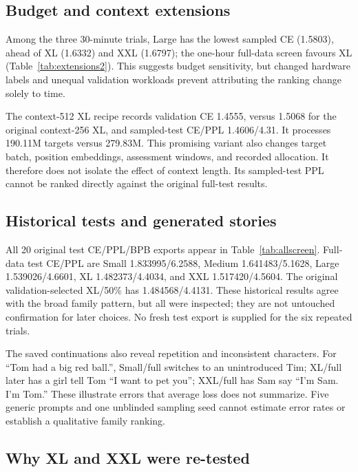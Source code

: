 \documentclass[10pt,twocolumn,letterpaper]{article}
\begin{document}
\subsection{Budget and context extensions}

Among the three 30-minute trials, Large has the lowest sampled CE (1.5803),
ahead of XL (1.6332) and XXL (1.6797); the one-hour full-data screen favours XL
(Table~\ref{tab:extensions2}). This suggests budget sensitivity, but changed
hardware labels and unequal validation workloads prevent attributing the
ranking change solely to time.



The context-512 XL recipe records validation CE 1.4555, versus 1.5068 for the
original context-256 XL, and sampled-test CE/PPL 1.4606/4.31. It processes
190.11M targets versus 279.83M. This promising variant also changes target
batch, position embeddings, assessment windows, and recorded allocation.
It therefore does not isolate the effect of context length. Its sampled-test
PPL cannot be ranked directly against the original full-test results.

\subsection{Historical tests and generated stories}

All 20 original test CE/PPL/BPB exports appear in Table~\ref{tab:allscreen}.
Full-data test CE/PPL are Small 1.833995/6.2588, Medium 1.641483/5.1628,
Large 1.539026/4.6601, XL 1.482373/4.4034, and XXL 1.517420/4.5604.
The original validation-selected XL/50\% has 1.484568/4.4131. These historical
results agree with the broad family pattern, but all were inspected; they are
not untouched confirmation for later choices. No fresh test export is supplied
for the six repeated trials.

The saved continuations also reveal repetition and inconsistent characters.
For ``Tom had a big red ball.'', Small/full switches to an unintroduced Tim;
XL/full later has a girl tell Tom ``I want to pet you''; XXL/full has Sam say
``I'm Sam. I'm Tom.'' These illustrate errors that average loss does not
summarize. Five generic prompts and one unblinded sampling seed cannot estimate
error rates or establish a qualitative family ranking.

\subsection{Why XL and XXL were re-tested}
\end{document}
